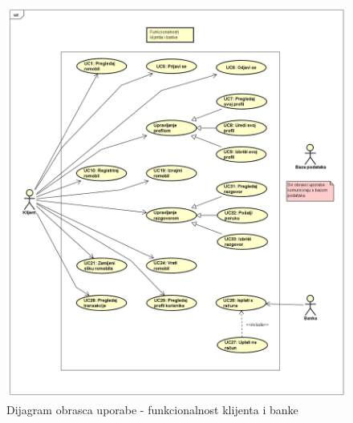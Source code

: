 					\begin{figure} [H]
						
						\includegraphics[width=1\linewidth]{dijagrami/klijent_i_banka.png}
						\centering
						\caption{Dijagram obrasca uporabe - funkcionalnost klijenta i banke}
						\label{fig:Dijagram obrasca uporabe - funkcionalnost klijenta i banke}
					\end{figure}
					
